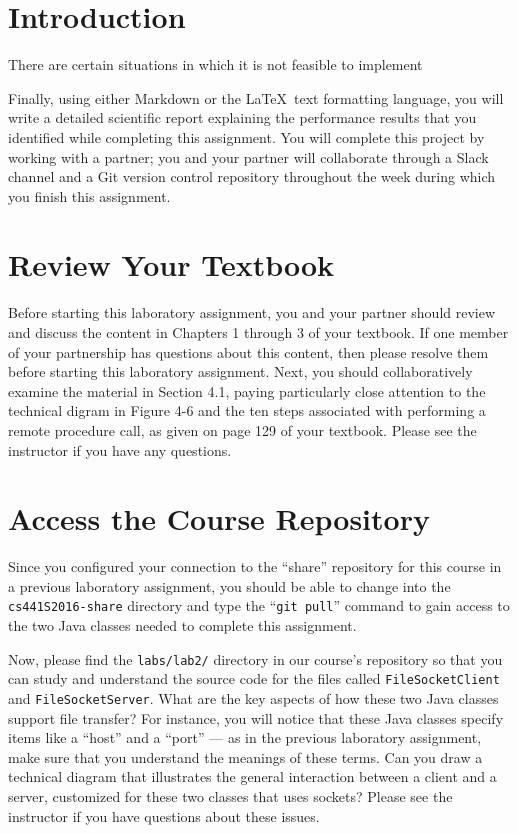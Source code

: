 

\usepackage[compact]{titlesec}



\section*{Introduction}

There are certain situations in which it is not feasible to implement 

Finally, using either Markdown or the \LaTeX~text formatting language, you
will write a detailed scientific report explaining the performance results that you identified while completing this
assignment. You will complete this project by working with a partner; you and your partner will collaborate through a
Slack channel and a Git version control repository throughout the week during which you finish this assignment.

\section*{Review Your Textbook}

Before starting this laboratory assignment, you and your partner should review and discuss the content in Chapters 1
through 3 of your textbook. If one member of your partnership has questions about this content, then please resolve them
before starting this laboratory assignment. Next, you should collaboratively examine the material in Section 4.1, paying
particularly close attention to the technical digram in Figure 4-6 and the ten steps associated with performing a remote
procedure call, as given on page 129 of your textbook. Please see the instructor if you have any questions.

\section*{Access the Course Repository}

Since you configured your connection to the ``share'' repository for this course in a previous laboratory assignment,
you should be able to change into the {\tt cs441S2016-share} directory and type the ``{\tt git pull}'' command to gain
access to the two Java classes needed to complete this assignment.

Now, please find the {\tt labs/lab2/} directory in our course's repository so that you can study and understand the
source code for the files called {\tt FileSocketClient} and {\tt FileSocketServer}. What are the key aspects of how
these two Java classes support file transfer? For instance, you will notice that these Java classes specify items like a
``host'' and a ``port'' --- as in the previous laboratory assignment, make sure that you understand the meanings of
these terms. Can you draw a technical diagram that illustrates the general interaction between a client and a server,
customized for these two classes that uses sockets? Please see the instructor if you have questions about these issues.


